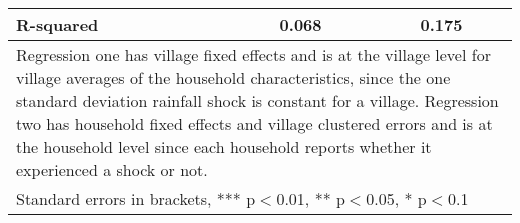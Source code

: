 \begin{table}
\begin{tabular}{lcc}
R-squared & 0.068 & 0.175 \\ \hline
\multicolumn{3}{p{12cm}}{Regression one has village fixed effects and is at the village level for village averages of the household characteristics, since the one standard deviation rainfall shock is constant for a village. Regression two has household fixed effects and village clustered errors and is at the household level since each household reports whether it experienced a shock or not.  } \\
\multicolumn{3}{l}{ Standard errors in brackets, *** p$<$0.01, ** p$<$0.05, * p$<$0.1} \\
\end{tabular}
\end{table}